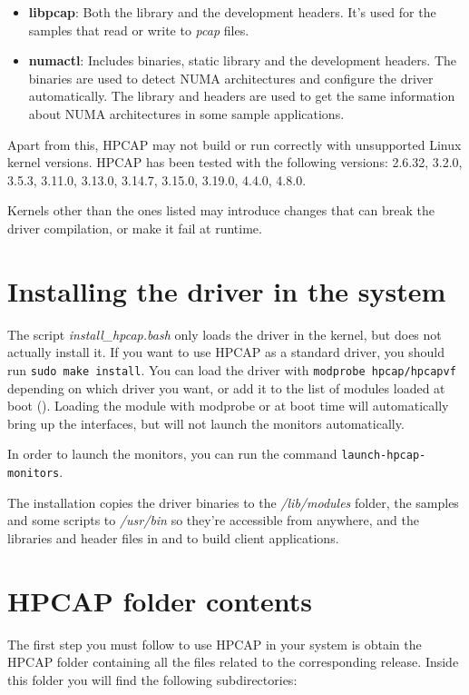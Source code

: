 \documentclass[a4paper,oneside]{hpman}
\newcommand{\supportedkernels}{2.6.32, 3.2.0, 3.5.3, 3.11.0, 3.13.0, 3.14.7, 3.15.0, 3.19.0, 4.4.0, 4.8.0}
\begin{document}
\begin{itemize}
\item \textbf{libpcap}: Both the library and the development headers. It's used for the samples that read or write to \textit{pcap} files.
\item \textbf{numactl}: Includes binaries, static library and the development headers. The binaries are used to detect NUMA architectures and configure the driver automatically. The library and headers are used to get the same information about NUMA architectures in some sample applications.
\end{itemize}

Apart from this, HPCAP may not build or run correctly with unsupported Linux kernel versions. HPCAP has been tested with the following versions: \supportedkernels.

Kernels other than the ones listed may introduce changes that can break the driver compilation, or make it fail at runtime.

\section{Installing the driver in the system}
\label{sec:SystemInstall}

The script \textit{install\_hpcap.bash} only loads the driver in the kernel, but does not actually install it. If you want to use HPCAP as a standard driver, you should run \texttt{sudo make install}. You can load the driver with \texttt{modprobe hpcap/hpcapvf} depending on which driver you want, or add it to the list of modules loaded at boot (). Loading the module with modprobe or at boot time will automatically bring up the interfaces, but will not launch the monitors automatically.

In order to launch the monitors, you can run the command \texttt{launch-hpcap-monitors}.

The installation copies the driver binaries to the \textit{/lib/modules} folder, the samples and some scripts to \textit{/usr/bin} so they're accessible from anywhere, and the libraries and header files in  and  to build client applications.

\section{HPCAP folder contents}

The first step you must follow to use HPCAP in your system is obtain the HPCAP folder containing all the files related to the corresponding release. Inside this folder you will find the following subdirectories:
\end{document}
